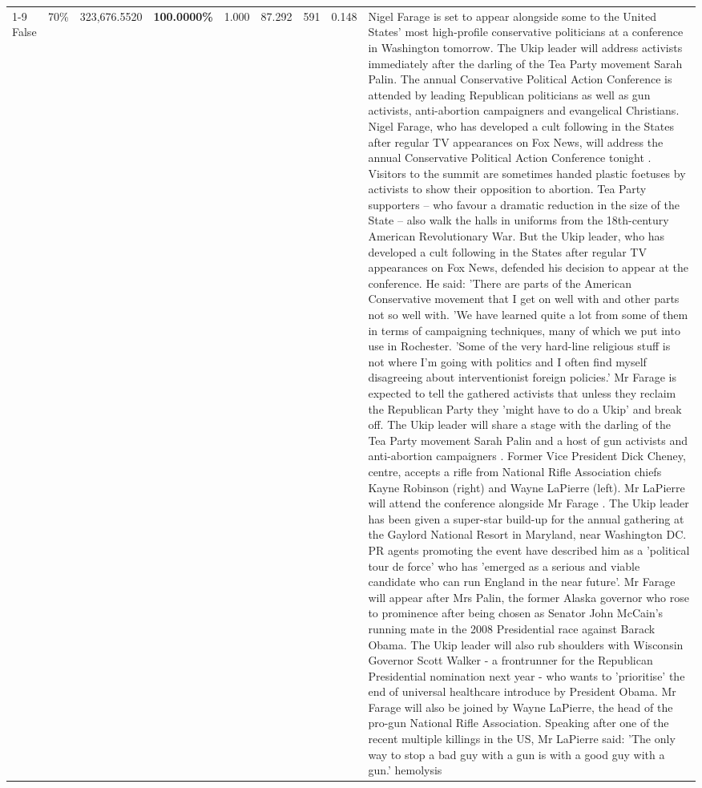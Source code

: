 \begin{table}[H]
\begin{tabular}{lllrlllll}
\cline{1-9} \cline{2-9}
False & 70\% & 323,676.5520 & \bfseries \color{red} 100.0000\% & 1.000 & 87.292 & 591 & 0.148 & Nigel Farage is set to appear alongside some to the United States' most high-profile conservative politicians at a conference in Washington tomorrow. The Ukip leader will address activists immediately after the darling of the Tea Party movement Sarah Palin. The annual Conservative Political Action Conference is attended by leading Republican politicians as well as gun activists, anti-abortion campaigners and evangelical Christians. Nigel Farage, who has developed a cult following in the States after regular TV appearances on Fox News, will address the annual Conservative Political Action Conference tonight . Visitors to the summit are sometimes handed plastic foetuses by activists to show their opposition to abortion. Tea Party supporters – who favour a dramatic reduction in the size of the State – also walk the halls in uniforms from the 18th-century American Revolutionary War. But the Ukip leader, who has developed a cult following in the States after regular TV appearances on Fox News, defended his decision to appear at the conference. He said: 'There are parts of the American Conservative movement that I get on well with and other parts not so well with. 'We have learned quite a lot from some of them in terms of campaigning techniques, many of which we put into use in Rochester. 'Some of the very hard-line religious stuff is not where I'm going with politics and I often find myself disagreeing about interventionist foreign policies.' Mr Farage is expected to tell the gathered activists that unless they reclaim the Republican Party they 'might have to do a Ukip' and break off. The Ukip leader will share a stage with the darling of the Tea Party movement Sarah Palin and a host of gun activists and anti-abortion campaigners . Former Vice President Dick Cheney, centre, accepts a rifle from National Rifle Association chiefs Kayne Robinson (right) and Wayne LaPierre (left). Mr LaPierre will attend the conference alongside Mr Farage . The Ukip leader has been given a super-star build-up for the annual gathering at the Gaylord National Resort in Maryland, near Washington DC. PR agents promoting the event have described him as a 'political tour de force' who has 'emerged as a serious and viable candidate who can run England in the near future'. Mr Farage will appear after Mrs Palin, the former Alaska governor who rose to prominence after being chosen as Senator John McCain's running mate in the 2008 Presidential race against Barack Obama. The Ukip leader will also rub shoulders with Wisconsin Governor Scott Walker - a frontrunner for the Republican Presidential nomination next year - who wants to 'prioritise' the end of universal healthcare introduce by President Obama. Mr Farage will also be joined by Wayne LaPierre, the head of the pro-gun National Rifle Association. Speaking after one of the recent multiple killings in the US, Mr LaPierre said: 'The only way to stop a bad guy with a gun is with a good guy with a gun.' hemolysis \\

\end{tabular}
\end{table}
